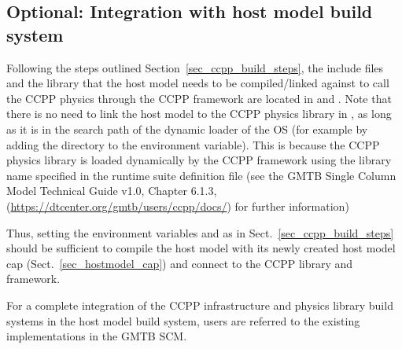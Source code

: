 \subsection{Optional: Integration with host model build system}
Following the steps outlined Section~\ref{sec_ccpp_build_steps}, the include files and the library  that the host model needs to be compiled/linked against to call the CCPP physics through the CCPP framework are located in  and . Note that there is no need to link the host model to the CCPP physics library in , as long as it is in the search path of the dynamic loader of the OS (for example by adding the directory  to the  environment variable). This is because the CCPP physics library is loaded dynamically by the CCPP framework using the library name specified in the runtime suite definition file (see the GMTB Single Column Model Technical Guide v1.0, Chapter 6.1.3, (\url{https://dtcenter.org/gmtb/users/ccpp/docs/}) for further information)

Thus, setting the environment variables  and  as in Sect.~\ref{sec_ccpp_build_steps} should be sufficient to compile the host model with its newly created host model cap (Sect.~\ref{sec_hostmodel_cap}) and connect to the CCPP library and framework.

For a complete integration of the CCPP infrastructure and physics library build systems in the host model build system, users are referred to the existing implementations in the GMTB SCM.
